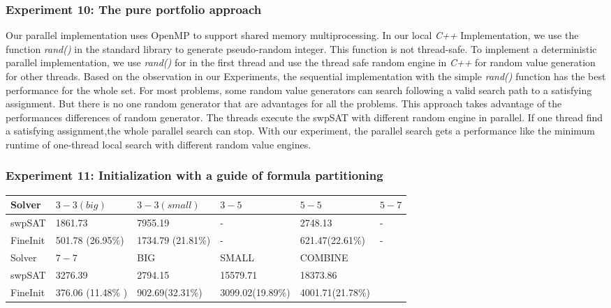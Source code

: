 \documentclass[12pt,a4paper,twoside]{scrartcl}
\numberwithin{equation}{section}
\begin{document}
\subsubsection{Experiment 10: The pure portfolio approach} 
Our parallel implementation uses OpenMP to support shared memory multiprocessing. In our local \emph{C++} Implementation, we use the function \emph{rand()} in the standard library to generate pseudo-random integer. This function is not thread-safe. To implement a deterministic parallel implementation, we use \emph{rand()}  for in the first thread and use the thread safe random engine in \emph{C++} for random value generation for other threads. Based on the observation in our Experiments, the sequential implementation with the simple \emph{rand()} function has the best performance for the whole set. For most problems, some random value generators can search following a valid search path to a satisfying assignment. But there is no one random generator that are advantages for all the problems. This approach takes advantage of the performances differences of random generator. The threads execute the swpSAT with different random engine in parallel. If one thread find a satisfying assignment,the whole parallel search can stop. With our experiment, the parallel search gets a performance like the minimum runtime of one-thread local search with different random value engines. 
\subsubsection{Experiment 11: Initialization with a guide of formula partitioning} 
\begin{table}[h!]
\begin{center}
    \begin{tabular}{|l|l|l|l|l|p{1cm}|}
\hline 
    Solver &$3-3(big)$&$3-3(small)$&$3-5$&$5-5$&$5-7$\\ \hline
   	swpSAT &1861.73	&7955.19 &-	&2748.13&-\\ \hline
    FineInit& 501.78 (26.95\%)& 1734.79 (21.81\%) &-&621.47(22.61\%)&- \\ \hline
     \hline
    Solver & $7-7$ & BIG & SMALL & COMBINE &\\ \hline
    swpSAT &3276.39	&	2794.15 &15579.71& 18373.86&\\ \hline
    FineInit&376.06 (11.48\% )&902.69(32.31\%) & 3099.02(19.89\%)&4001.71(21.78\%)&\\ \hline
\end{tabular}
\end{center}
\end{table} 
\end{document}

